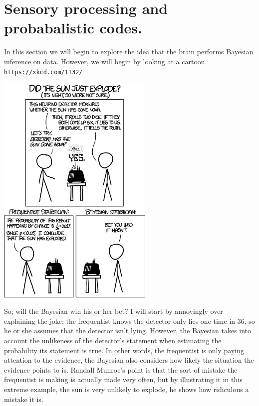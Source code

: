 \documentclass{article}
\begin{document}
\section*{Sensory processing and probabalistic codes.}

In this section we will begin to explore the idea that the brain
performs Bayesian inference on data. However, we will begin by looking at a cartoon \texttt{https://xkcd.com/1132/}

\begin{center}
\includegraphics[width=7.5cm]{frequentists_vs_bayesians.png}
\end{center}

So; will the Bayesian win his or her bet? I will start by annoyingly
over explaining the joke; the frequentist knows the detector only lies
one time in 36, so he or she assumes that the detector isn't
lying. However, the Bayesian takes into account the unlikeness of
the detector's statement when estimating the probability its
statement is true. In other words, the frequentist is only paying
attention to the evidence, the Bayesian also considers how likely the
situation the evidence points to is. Randall Munroe's point is that
the sort of mistake the frequentist is making is actually made very
often, but by illustrating it in this extreme example, the sun is very
unlikely to explode, he shows how ridiculous a mistake it is. 
\end{document}
